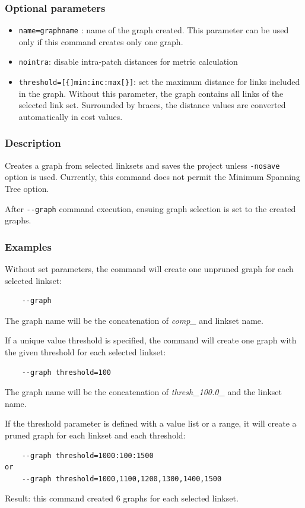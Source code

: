 \documentclass[a4paper,10pt]{report}
\begin{document}
\subsubsection{Optional parameters}
\begin{itemize}
	\item \verb|name=graphname| : name of the graph created. This parameter can be used only if this command creates only one graph.
	\item \verb|nointra|: disable intra-patch distances for metric calculation
	\item \verb|threshold=[{]min:inc:max[}]|: set the maximum distance for links included in the graph. Without this parameter, the graph contains all links of the selected link set. Surrounded by braces, the distance values are converted automatically in cost values.
\end{itemize}

\subsubsection{Description}
Creates a graph from selected linksets and saves the project unless \verb|-nosave| option is used. 
Currently, this command does not permit the Minimum Spanning Tree option.

After \verb|--graph| command execution, ensuing graph selection is set to the created graphs.

\subsubsection{Examples}
Without set parameters, the command will create one unpruned graph for each selected linkset:
\begin{Verbatim}
	--graph
\end{Verbatim}
The graph name will be the concatenation of \textit{comp\_} and linkset name.

If a unique value threshold is specified, the command will create one graph with the given threshold for each selected linkset:
\begin{Verbatim}
	--graph threshold=100
\end{Verbatim}
The graph name will be the concatenation of \textit{thresh\_100.0\_} and the linkset name.

If the threshold parameter is defined with a value list or a range, it will create a pruned graph for each linkset and each threshold:
\begin{Verbatim}
	--graph threshold=1000:100:1500
or
	--graph threshold=1000,1100,1200,1300,1400,1500
\end{Verbatim}
Result: this command created 6 graphs for each selected linkset.
\end{document}

